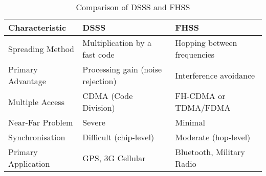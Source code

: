 \begin{table}[H]
    \centering
    \caption{Comparison of DSSS and FHSS}
    \label{tab:dsss-vs-fhss}
    \begin{tabular}{@{}lll@{}}
        \toprule
        \tableheaderfont Characteristic & \tableheaderfont DSSS & \tableheaderfont FHSS \\
        \midrule
        Spreading Method & Multiplication by a fast code & Hopping between frequencies \\
        Primary Advantage & Processing gain (noise rejection) & Interference avoidance \\
        Multiple Access & CDMA (Code Division) & FH-CDMA or TDMA/FDMA \\
        Near-Far Problem & Severe & Minimal \\
        Synchronisation & Difficult (chip-level) & Moderate (hop-level) \\
        Primary Application & GPS, 3G Cellular & Bluetooth, Military Radio \\
        \bottomrule
    \end{tabular}
\end{table}


